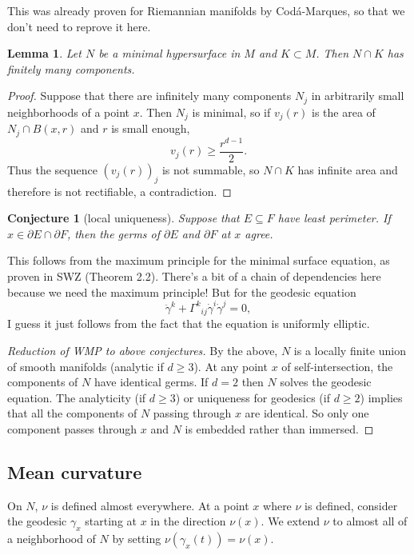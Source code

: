 \documentclass[reqno,12pt,letterpaper]{amsart}
\newtheorem{lemma}[theorem]{Lemma}
\newtheorem{conjecture}[theorem]{Conjecture}
\theoremstyle{definition}
\numberwithin{equation}{section}
\begin{document}
This was already proven for Riemannian manifolds by Cod\'a-Marques, so that we don't need to reprove it here.

\begin{lemma}
Let $N$ be a minimal hypersurface in $M$ and $K \subset M$.
Then $N \cap K$ has finitely many components.
\end{lemma}
\begin{proof}
Suppose that there are infinitely many components $N_j$ in arbitrarily small neighborhoods of a point $x$.
Then $N_j$ is minimal, so if $v_j(r)$ is the area of $N_j \cap B(x, r)$ and $r$ is small enough,
$$v_j(r) \geq \frac{r^{d - 1}}{2}.$$
Thus the sequence $(v_j(r))_j$ is not summable, so $N \cap K$ has infinite area and therefore is not rectifiable, a contradiction.
\end{proof}

\begin{conjecture}[local uniqueness]
Suppose that $E \subseteq F$ have least perimeter. If $x \in \partial E \cap \partial F$, then the germs of $\partial E$ and $\partial F$ at $x$ agree.
\end{conjecture}

This follows from the maximum principle for the minimal surface equation, as proven in SWZ (Theorem 2.2).
There's a bit of a chain of dependencies here because we need the maximum principle!
But for the geodesic equation
$$\ddot \gamma^k + {\Gamma^k}_{ij} \dot \gamma^i \dot \gamma^j = 0,$$
I guess it just follows from the fact that the equation is uniformly elliptic.

\begin{proof}[Reduction of WMP to above conjectures]
By the above, $N$ is a locally finite union of smooth manifolds (analytic if $d \geq 3$).
At any point $x$ of self-intersection, the components of $N$ have identical germs.
If $d = 2$ then $N$ solves the geodesic equation.
The analyticity (if $d \geq 3$) or uniqueness for geodesics (if $d \geq 2$) implies that all the components of $N$ passing through $x$ are identical.
So only one component passes through $x$ and $N$ is embedded rather than immersed.
\end{proof}

\subsection{Mean curvature}
On $N$, $\nu$ is defined almost everywhere. At a point $x$ where $\nu$ is defined, consider the geodesic $\gamma_x$ starting at $x$ in the direction $\nu(x)$.
We extend $\nu$ to almost all of a neighborhood of $N$ by setting $\nu(\gamma_x(t)) = \nu(x)$.
\end{document}
